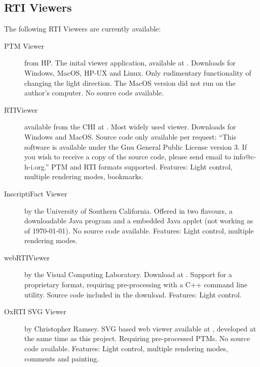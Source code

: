 \subsection{RTI Viewers}
The following RTI Viewers are currently available:
\begin{description}
\item[PTM Viewer]  from HP. The inital viewer application, available at
  \cite*{noauthor_hp_nodate}. Downloads for Windows, MacOS, HP-UX and Linux.
  Only rudimentary functionality of changing the light direction. The MacOS
  version did not run on the author's computer. No source code available.
\item[RTIViewer] available from the CHI at \cite*{noauthor_cultural_nodate-1}.
  Most widely used viewer. Downloads for Windows and MacOS\@. Source code only available per request:
  ``This software is available under the Gnu General Public License version 3.
  If you wish to receive a copy of the source code, please send email to
  info@c-h-i.org.'' PTM and RTI formats supported. Features: Light control, multiple rendering
  modes, bookmarks.
\item[InscriptiFact Viewer] by the University of Southern California. Offered in two flavours, a downloadable Java
  program\cite*{noauthor_inscriptifact_nodate-1} and a embedded Java
  applet\cite*{noauthor_inscriptifact_nodate} (not working as of \today). No
  source code available. Features: Light control, multiple rendering modes.
\item[webRTIViewer] by the Visual Computing Laboratory. Download at
  \cite*{noauthor_reflectance_nodate}. Support for a proprietary format,
  requiring pre-processing with a C++ command line utility. Source code
  included in the download. Features: Light control.
\item[OxRTI SVG Viewer] by Christopher Ramsey. SVG based web viewer available at
  \cite*{noauthor_oxrti_nodate}, developed at the same time as this project.
  Requiring pre-processed PTMs. No source code available. Features: Light control, multiple rendering modes,
  comments and painting.
\end{description}
